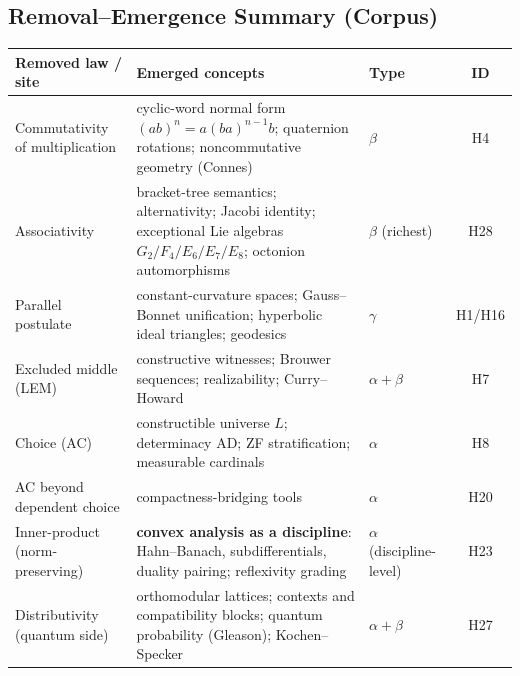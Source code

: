 
\subsection{Removal--Emergence Summary (Corpus)}\label{sec:act3-summary}

\begin{table}[h]
\centering\small
\begin{tabular}{lp{}lc}
\toprule
\textbf{Removed law / site} & \textbf{Emerged concepts} & \textbf{Type} & \textbf{ID} \\
\midrule
Commutativity of multiplication & cyclic-word normal form
$(ab)^n = a(ba)^{n-1}b$; quaternion rotations; noncommutative geometry
(Connes) & $\beta$ & H4 \\
Associativity & bracket-tree semantics; alternativity; Jacobi
identity; exceptional Lie algebras $G_2/F_4/E_6/E_7/E_8$; octonion
automorphisms & $\beta$ (richest) & H28 \\
Parallel postulate & constant-curvature spaces; Gauss--Bonnet
unification; hyperbolic ideal triangles; geodesics & $\gamma$ &
H1/H16 \\
Excluded middle (LEM) & constructive witnesses; Brouwer sequences;
realizability; Curry--Howard & $\alpha{+}\beta$ & H7 \\
Choice (AC) & constructible universe $L$; determinacy AD; ZF
stratification; measurable cardinals & $\alpha$ & H8 \\
AC beyond dependent choice & compactness-bridging tools & $\alpha$ &
H20 \\
Inner-product (norm-preserving) & \textbf{convex analysis as a
discipline}: Hahn--Banach, subdifferentials, duality pairing;
reflexivity grading & $\alpha$ (discipline-level) & H23 \\
Distributivity (quantum side) & orthomodular lattices; contexts and
compatibility blocks; quantum probability (Gleason);
Kochen--Specker & $\alpha{+}\beta$ & H27 \\

\end{tabular}
\end{table}
